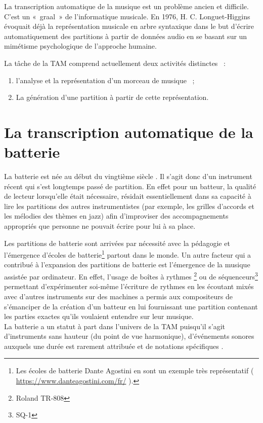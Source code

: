 La transcription automatique de la musique est un problème ancien et difficile.
C’est un «~graal~» de l’informatique musicale. En 1976, H. C. Longuet-Higgins
\cite{first_one} évoquait déjà la représentation musicale en arbre syntaxique
dans le but d’écrire automatiquement des partitions à partir de données audio
en se basant sur un mimétisme psychologique de l’approche humaine.

La tâche de la TAM comprend actuellement deux activités distinctes~ :
\begin{enumerate}
    \item l’analyse et la représentation d’un morceau de musique~ ;
    \item La génération d’une partition à partir de cette représentation.
\end{enumerate}

\section{La transcription automatique de la batterie}
La batterie est née au début du vingtième siècle \cite{histoire_drum_1}. Il
s’agit donc d’un instrument récent qui s’est longtemps passé de partition. En
effet pour un batteur, la qualité de lecteur lorsqu’elle était nécessaire,
résidait essentiellement dans sa capacité à lire les partitions des autres
instrumentistes (par exemple, les grilles d’accords et les mélodies des thèmes
en jazz) afin d’improviser des accompagnements appropriés que personne ne
pouvait écrire pour lui à sa place.
 
Les partitions de batterie sont arrivées par nécessité avec la pédagogie et
l’émergence d’écoles de batterie\footnote{Les écoles de batterie Dante Agostini
en sont un exemple très représentatif (\url{ https://www.danteagostini.com/fr/}
).} partout dans le monde. Un autre facteur qui a contribué à l’expansion des
partitions de batterie est l’émergence de la musique assistée par ordinateur.
En effet, l’usage de boîtes à rythmes \footnote{Roland TR-808} ou de
séquenceurs\footnote{SQ-1} permettant d’expérimenter soi-même l’écriture de
rythmes en les écoutant mixés avec d’autres instruments sur des machines a
permis aux compositeurs de s’émanciper de la création d’un batteur en lui
fournissant une partition contenant les parties exactes qu’ils voulaient
entendre sur leur musique.\\

La batterie a un statut à part dans l’univers de la TAM puisqu’il s’agit
d’instruments sans hauteur (du point de vue harmonique), d’événements sonores
auxquels une durée est rarement attribuée et de notations spécifiques
\cite{Review_ADT}.

